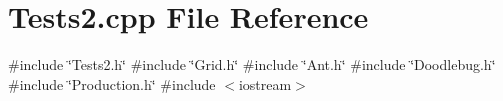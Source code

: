 \section{Tests2.\+cpp File Reference}
\label{Tests2_8cpp}
{\ttfamily \#include \char`\"{}Tests2.\+h\char`\"{}}\newline
{\ttfamily \#include \char`\"{}Grid.\+h\char`\"{}}\newline
{\ttfamily \#include \char`\"{}Ant.\+h\char`\"{}}\newline
{\ttfamily \#include \char`\"{}Doodlebug.\+h\char`\"{}}\newline
{\ttfamily \#include \char`\"{}Production.\+h\char`\"{}}\newline
{\ttfamily \#include $<$iostream$>$}\newline

